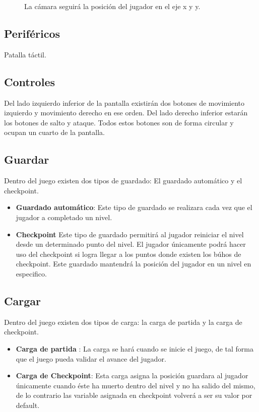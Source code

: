 \documentclass[11pt,letterpaper]{article}
\begin{document}
\begin{figure}
  \centering
  \caption{La cámara seguirá la posición del jugador en el eje x y y.}
  \label{fig:Camara}
\end{figure} 
	\subsection{Periféricos}
	Patalla táctil.
	\subsection{Controles}
	Del lado izquierdo inferior de la pantalla existirán dos botones de movimiento izquierdo y movimiento derecho en ese orden. Del lado derecho inferior estarán los botones de salto y ataque. Todos estos botones son de forma circular y ocupan un cuarto de la pantalla.
	\subsection{Guardar}
Dentro del juego existen dos tipos de guardado: El guardado automático y el checkpoint.
\begin{itemize}
	\item \textbf{Guardado automático}: Este tipo de guardado se realizara cada vez que el jugador a completado un nivel.
	\item \textbf{Checkpoint} Este tipo de guardado permitirá al jugador reiniciar el nivel desde un determinado punto del nivel. El jugador únicamente podrá hacer uso del checkpoint si logra llegar a los puntos donde existen los búhos de checkpoint. Este guardado mantendrá la posición del jugador en un nivel en especifico.
\end{itemize}

	\subsection{Cargar}
Dentro del juego existen dos tipos de carga: la carga de partida y la carga de checkpoint.
 \begin{itemize}
 	\item \textbf{ Carga de partida }: La carga se hará cuando se inicie el juego, de tal forma que el juego pueda validar el avance del jugador. 
 	\item \textbf{Carga de Checkpoint}:  Esta carga asigna la posición guardara al jugador únicamente cuando éste ha muerto dentro del nivel y no ha salido del mismo, de lo contrario las variable asignada en checkpoint volverá a ser su valor por default.
 \end{itemize}
\end{document}

